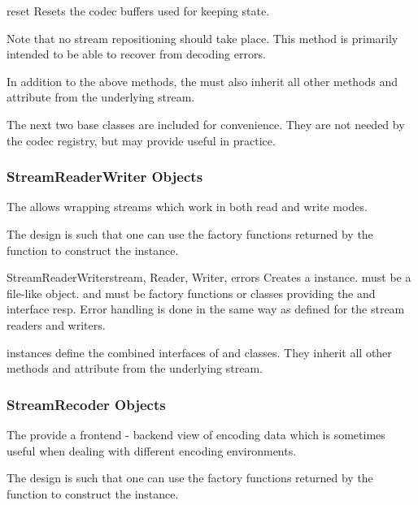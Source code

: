 \begin{methoddesc}{reset}{}
  Resets the codec buffers used for keeping state.

  Note that no stream repositioning should take place.  This method is
  primarily intended to be able to recover from decoding errors.
\end{methoddesc}

In addition to the above methods, the  must also
inherit all other methods and attribute from the underlying stream.

The next two base classes are included for convenience. They are not
needed by the codec registry, but may provide useful in practice.


\subsubsection{StreamReaderWriter Objects \label{stream-reader-writer}}

The  allows wrapping streams which work in
both read and write modes.

The design is such that one can use the factory functions returned by
the  function to construct the instance.

\begin{classdesc}{StreamReaderWriter}{stream, Reader, Writer, errors}
  Creates a  instance.
   must be a file-like object.
   and  must be factory functions or classes
  providing the  and  interface
  resp.
  Error handling is done in the same way as defined for the
  stream readers and writers.
\end{classdesc}

 instances define the combined interfaces of
 and  classes. They inherit
all other methods and attribute from the underlying stream.


\subsubsection{StreamRecoder Objects \label{stream-recoder-objects}}

The  provide a frontend - backend view of
encoding data which is sometimes useful when dealing with different
encoding environments.

The design is such that one can use the factory functions returned by
the  function to construct the instance.

